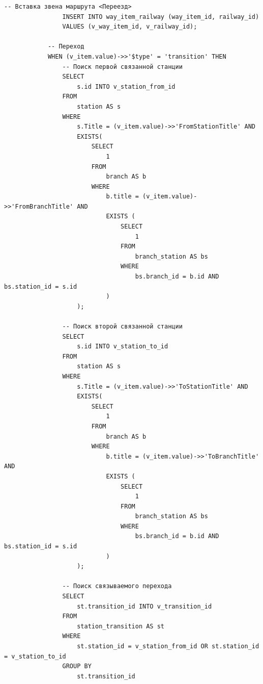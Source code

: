 \clearpage

\begin{lstlisting}[label=lst:add_route_json:3,caption=Реализация функции добавления маршрута (часть 3),firstnumber=124]
                -- Вставка звена маршрута <Переезд>
                INSERT INTO way_item_railway (way_item_id, railway_id)
                VALUES (v_way_item_id, v_railway_id);
            
            -- Переход
            WHEN (v_item.value)->>'$type' = 'transition' THEN               
                -- Поиск первой связанной станции
                SELECT
                    s.id INTO v_station_from_id
                FROM
                    station AS s
                WHERE
                    s.Title = (v_item.value)->>'FromStationTitle' AND
                    EXISTS(
                        SELECT
                            1
                        FROM
                            branch AS b
                        WHERE
                            b.title = (v_item.value)->>'FromBranchTitle' AND
                            EXISTS (
                                SELECT
                                    1
                                FROM
                                    branch_station AS bs
                                WHERE
                                    bs.branch_id = b.id AND bs.station_id = s.id
                            )
                    );
                
                -- Поиск второй связанной станции
                SELECT
                    s.id INTO v_station_to_id
                FROM
                    station AS s
                WHERE
                    s.Title = (v_item.value)->>'ToStationTitle' AND
                    EXISTS(
                        SELECT
                            1
                        FROM
                            branch AS b
                        WHERE
                            b.title = (v_item.value)->>'ToBranchTitle' AND
                            EXISTS (
                                SELECT
                                    1
                                FROM
                                    branch_station AS bs
                                WHERE
                                    bs.branch_id = b.id AND bs.station_id = s.id
                            )
                    );
                
                -- Поиск связываемого перехода
                SELECT
                    st.transition_id INTO v_transition_id
                FROM
                    station_transition AS st
                WHERE
                    st.station_id = v_station_from_id OR st.station_id = v_station_to_id
                GROUP BY
                    st.transition_id
\end{lstlisting}

